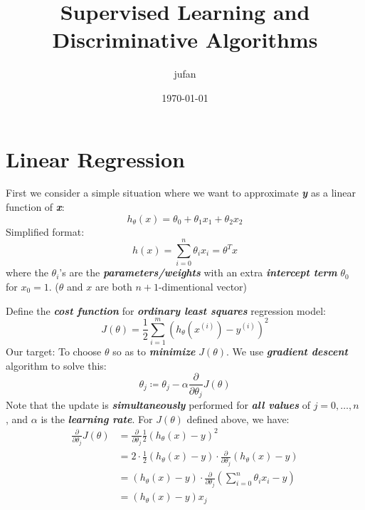 \documentclass{article}
\begin{document}
\title{Supervised Learning and Discriminative Algorithms}\author{jufan}\date{\today}
\maketitle
\tableofcontents

\section{Linear Regression}
First we consider a simple situation where we want to approximate \emph{\textbf{y}} as a linear function of \emph{\textbf{x}}:
\begin{equation*}
h_\theta(x)=\theta_0+\theta_1x_1+\theta_2x_2
\end{equation*}
Simplified format:
\begin{equation*}
h(x)=\sum\limits_{i=0}^n \theta_ix_i=\theta^Tx
\end{equation*}
where the $\theta_i$'s are the \emph{\textbf{parameters/weights}} with an extra \emph{\textbf{intercept term}} $\theta_0$ for $x_0=1$. ($\theta$ and $x$ are both $n+1$-dimentional vector)

Define the \emph{\textbf{cost function}} for \emph{\textbf{ordinary least squares}} regression model:
\begin{equation*}
J(\theta)=\frac{1}{2}\sum\limits_{i=1}^m(h_\theta(x^{(i)})-y^{(i)})^2
\end{equation*}
Our target: To choose $\theta$ so as to \emph{\textbf{minimize}} $J(\theta)$.
We use \emph{\textbf{gradient descent}} algorithm to solve this:
\begin{equation*}
\theta_j\coloneqq\theta_j-\alpha\frac{\partial}{\partial{\theta_j}}J(\theta)
\end{equation*}
Note that the update is \emph{\textbf{simultaneously}} performed for \emph{\textbf{all values}} of $j=0,\ldots,n$ , and $\alpha$ is the \emph{\textbf{learning rate}}.
\newline For $J(\theta)$ defined above, we have:
\begin{align*}
\frac{\partial}{\partial{\theta_j}}J(\theta) &= \frac{\partial}{\partial{\theta_j}}\frac{1}{2}(h_\theta(x)-y)^2 \\
                                             &= 2\cdot\frac{1}{2}(h_\theta(x)-y)\cdot\frac{\partial}{\partial{\theta_j}}(h_\theta(x)-y) \\
                                             &=
                                             (h_\theta(x)-y)\cdot\frac{\partial}{\partial{\theta_j}}\left(\sum\limits_{i=0}^n\theta_ix_i-y\right) \\
                                             &= (h_\theta(x)-y)x_j
\end{align*}
\end{document}
